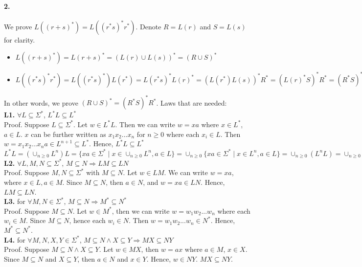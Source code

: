 \documentclass[12pt]{article}
\begin{document}
\paragraph*{2.} We prove \(L((r+s)^*) = L((r^*s)^*r^*)\). Denote \(R = L(r)\) and \(S = L(s)\) for clarity.
\begin{itemize}
  \item \(L((r+s)^*) = L(r+s)^* = (L(r) \cup L(s))^* = (R \cup S)^*\)
  \item \(L((r^*s)^*r^*) =  L((r^*s)^*)L(r^*) = L(r^*s)^*L(r)^* = (L(r^*)L(s))^*R^* = (L(r)^*S)^*R^* = (R^*S)^*R^*\)
\end{itemize}
In other words, we prove \((R \cup S)^* = (R^*S)^*R^*\). Laws that are needed:\\
\textbf{L1.} \(\forall L \subseteq \Sigma^*\), \(L^*L \subseteq L^*\)\\
Proof. Suppose \(L \subseteq \Sigma^*\). Let \(w \in L^*L\). Then we can write \(w = xa\) where \(x \in L^*\), \(a \in L\). \(x\) can be further written as \(x_1x_2...x_n\) for \(n \geq 0\) where each \(x_i \in L\). Then \(w = x_1x_2...x_na \in L^{n+1} \subseteq L^*\). Hence, \(L^*L \subseteq L^*\)
\(L^*L = (\cup_{n \geq 0}L^n)L = \{xa \in \Sigma^* \mid x \in \cup_{n \geq 0}L^n, a \in L\} = \cup_{n \geq 0}\{xa \in \Sigma^* \mid x \in L^n, a \in L\} = \cup_{n \geq 0}(L^nL) = \cup_{n \geq 0}L^{n+1} = \cup_{n \geq 1}L^{n} \subseteq L^*\)\\
\textbf{L2.} \(\forall L, M, N \subseteq \Sigma^*\), \(M \subseteq N \Rightarrow LM \subseteq LN\)\\
Proof. Suppose \(M, N \subseteq \Sigma^*\) with \(M \subseteq N\). Let \(w \in LM\). We can write \(w = xa\), where \(x \in L, a \in M\). Since \(M \subseteq N\), then \(a \in N\), and \(w = xa \in LN\). Hence, \(LM 
\subseteq LN\).\\
\textbf{L3.} for \(\forall M,N \in \Sigma^*\), \(M \subseteq N \Rightarrow M^* \subseteq N^*\)\\
Proof. Suppose \(M \subseteq N\). Let \(w \in M^*\), then we can write \(w = w_1w_2...w_n\) where each \(w_i \in M\). Since \(M \subseteq N\), hence each \(w_i \in N\). Then \(w = w_1w_2...w_n \in N^*\). Hence, \(M^* \subseteq N^*\).\\
\textbf{L4.} for \(\forall M,N,X,Y \in \Sigma^*\), \(M \subseteq N \land X \subseteq Y \Rightarrow MX \subseteq NY\)\\
Proof. Suppose \(M \subseteq N \land X \subseteq Y\). Let \(w \in MX\), then \(w = ax\) where \(a \in M\), \(x \in X\). Since \(M \subseteq N\) and \(X \subseteq Y\), then \(a \in N\) and \(x \in Y\). Hence, \(w \in NY\). \(MX \subseteq NY\).
\end{document}
